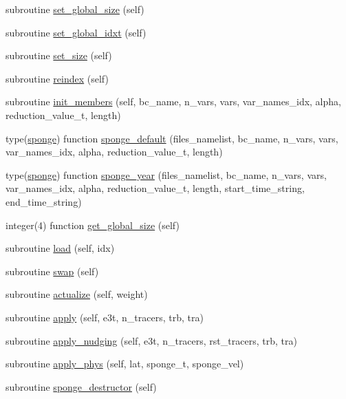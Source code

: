 \begin{DoxyCompactItemize}
\item 
subroutine \mbox{\hyperlink{namespacesponge__mod_a376ff12b55a16f0d269473358d14d3d4}{set\+\_\+global\+\_\+size}} (self)
\item 
subroutine \mbox{\hyperlink{namespacesponge__mod_afd5f45edb5ca5d029745c0e77aea263e}{set\+\_\+global\+\_\+idxt}} (self)
\item 
subroutine \mbox{\hyperlink{namespacesponge__mod_a9c570885a952e752d04ae3847b2b8ad8}{set\+\_\+size}} (self)
\item 
subroutine \mbox{\hyperlink{namespacesponge__mod_a0c7e9f96ac71dba07a66c590bf4ce653}{reindex}} (self)
\item 
subroutine \mbox{\hyperlink{namespacesponge__mod_aee13769fc020fcd44dd6f9a15c6859ef}{init\+\_\+members}} (self, bc\+\_\+name, n\+\_\+vars, vars, var\+\_\+names\+\_\+idx, alpha, reduction\+\_\+value\+\_\+t, length)
\item 
type(\mbox{\hyperlink{structsponge__mod_1_1sponge}{sponge}}) function \mbox{\hyperlink{namespacesponge__mod_a8d33aa09da835a9da7fb6553c521e2cb}{sponge\+\_\+default}} (files\+\_\+namelist, bc\+\_\+name, n\+\_\+vars, vars, var\+\_\+names\+\_\+idx, alpha, reduction\+\_\+value\+\_\+t, length)
\item 
type(\mbox{\hyperlink{structsponge__mod_1_1sponge}{sponge}}) function \mbox{\hyperlink{namespacesponge__mod_a3bc4faf589787c9eb594de38fcbc83b3}{sponge\+\_\+year}} (files\+\_\+namelist, bc\+\_\+name, n\+\_\+vars, vars, var\+\_\+names\+\_\+idx, alpha, reduction\+\_\+value\+\_\+t, length, start\+\_\+time\+\_\+string, end\+\_\+time\+\_\+string)
\item 
integer(4) function \mbox{\hyperlink{namespacesponge__mod_a2297300de5b2b8efa48a75a41a4fddc0}{get\+\_\+global\+\_\+size}} (self)
\item 
subroutine \mbox{\hyperlink{namespacesponge__mod_a78d5ababc793c40554ce37021372e8a5}{load}} (self, idx)
\item 
subroutine \mbox{\hyperlink{namespacesponge__mod_a922500c528c801f6423fea3e7b6a8601}{swap}} (self)
\item 
subroutine \mbox{\hyperlink{namespacesponge__mod_a791a9724fe6e817486294d084651901d}{actualize}} (self, weight)
\item 
subroutine \mbox{\hyperlink{namespacesponge__mod_a1aa7ab89cfc23b82c5bad4e63e056b45}{apply}} (self, e3t, n\+\_\+tracers, trb, tra)
\item 
subroutine \mbox{\hyperlink{namespacesponge__mod_ab024fda493622a2ac4e6f08ca72f2a3a}{apply\+\_\+nudging}} (self, e3t, n\+\_\+tracers, rst\+\_\+tracers, trb, tra)
\item 
subroutine \mbox{\hyperlink{namespacesponge__mod_a8204c3a6cd2ef9af239892d07afbc624}{apply\+\_\+phys}} (self, lat, sponge\+\_\+t, sponge\+\_\+vel)
\item 
subroutine \mbox{\hyperlink{namespacesponge__mod_a9c2f44eaa685af1b1a2145dc9c60003d}{sponge\+\_\+destructor}} (self)
\end{DoxyCompactItemize}


